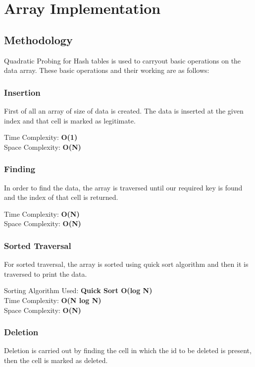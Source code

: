 \chapter{Array Implementation} %
\label{Chapter4}
\section{Methodology}
Quadratic Probing for Hash tables is used to carryout basic operations on the data array. These basic operations and their working are as follows:

\subsection{Insertion}
First of all an array of size of data is created. The data is inserted at the given index and that cell is marked as legitimate.

Time Complexity: \textbf{O(1)} \\
Space Complexity: \textbf{O(N)}

\subsection{Finding}
In order to find the data, the array is traversed until our required key is found and the index of that cell is returned.

Time Complexity: \textbf{O(N)} \\
Space Complexity: \textbf{O(N)}

\subsection{Sorted Traversal}
For sorted traversal, the array is sorted using quick sort algorithm and then it is traversed to print the data.

Sorting Algorithm Used: \textbf{Quick Sort O(log N)} \\
Time Complexity: \textbf{O(N log N)}\\ 
Space Complexity: \textbf{O(N)} \\

\subsection{Deletion}
Deletion is carried out by finding the cell in which the id to be deleted is present, then the cell is marked as deleted. 

